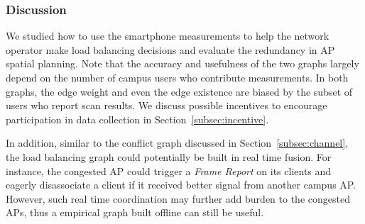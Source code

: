 \subsubsection{Discussion}

We studied how to use the smartphone measurements to help the network operator
make load balancing decisions and evaluate the redundancy in AP spatial
planning. Note that the accuracy and usefulness of the two graphs largely depend
on the number of campus \wifi{} users who contribute measurements. In both
graphs, the edge weight and even the edge existence are biased by the subset of
users who report scan results. We discuss possible incentives to encourage
participation in data collection in Section~\ref{subsec:incentive}.

In addition, similar to the conflict graph discussed in
Section~\ref{subsec:channel}, the load balancing graph could potentially be built
in real time fusion. For instance, the congested AP could trigger a \textit{Frame
Report} on its clients and eagerly disassociate a client if it received better
signal from another campus AP. However, such real time coordination may further
add burden to the congested APs, thus a empirical graph built offline can still
be useful.
